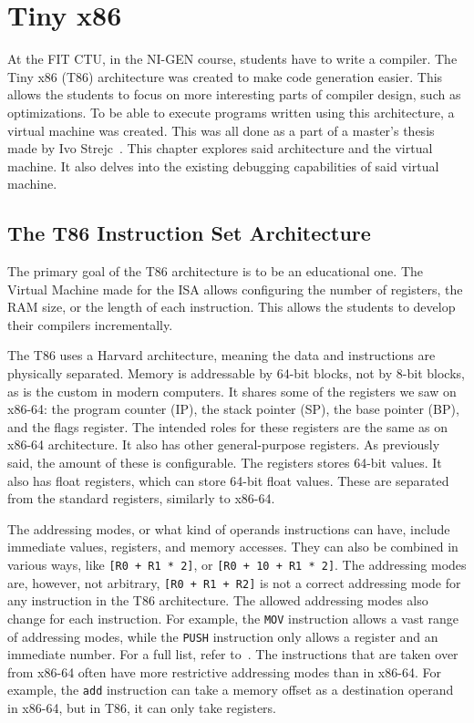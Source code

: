\chapter{Tiny x86}\label{section:T86}
At the FIT CTU, in the NI-GEN course, students have to write a compiler. The
Tiny x86 (T86) architecture was created to make code generation easier. This
allows the students to focus on more interesting parts of compiler design, such
as optimizations. To be able to execute programs written using this
architecture, a virtual machine was created. This was all done as a part of a
master's thesis made by Ivo Strejc~\cite{ivo2021tiny}. This chapter explores
said architecture and the virtual machine. It also delves into the existing
debugging capabilities of said virtual machine.

\section{The T86 Instruction Set Architecture}
The primary goal of the T86 architecture is to be an educational one. The
Virtual Machine made for the ISA allows configuring the number of registers,
the RAM size, or the length of each instruction. This allows the students to
develop their compilers incrementally.

The T86 uses a Harvard architecture, meaning the data and instructions are
physically separated. Memory is addressable by 64-bit blocks, not by 8-bit
blocks, as is the custom in modern computers. It shares some of the registers
we saw on x86-64: the program counter (IP), the stack pointer (SP), the base
pointer (BP), and the flags register. The intended roles for these registers
are the same as on x86-64 architecture. It also has other general-purpose
registers. As previously said, the amount of these is configurable. The
registers stores 64-bit values. It also has float registers, which can store
64-bit float values. These are separated from the standard registers, similarly
to x86-64.

The addressing modes, or what kind of operands instructions can have, include
immediate values, registers, and memory accesses. They can also be combined in
various ways, like \texttt{[R0 + R1 * 2]}, or \texttt{[R0 + 10 + R1 * 2]}. The
addressing modes are, however, not arbitrary, \texttt{[R0 + R1 + R2]} is not a
correct addressing mode for any instruction in the T86 architecture. The
allowed addressing modes also change for each instruction. For example, the
\texttt{MOV} instruction allows a vast range of addressing modes, while the
\texttt{PUSH} instruction only allows a register and an immediate number. For a
full list, refer to~\cite{ivo2021tiny}. The instructions that are taken over
from x86-64 often have more restrictive addressing modes than in x86-64. For
example, the \verb|add| instruction can take a memory offset as a destination
operand in x86-64, but in T86, it can only take registers.

